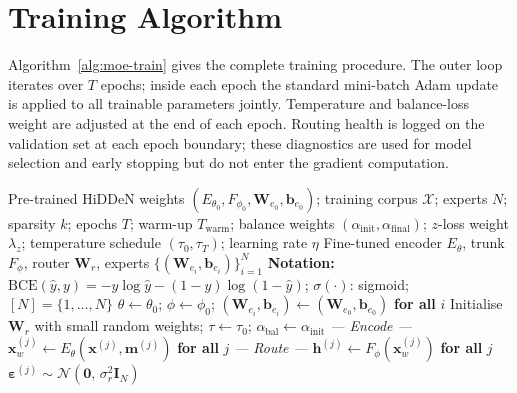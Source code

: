 ﻿\documentclass[12pt, a4paper, twoside]{report}
\numberwithin{equation}{chapter}
\begin{document}
\section{Training Algorithm}
\label{sec:training-alg}

Algorithm~\ref{alg:moe-train} gives the complete training procedure. The outer loop iterates over $T$ epochs; inside each epoch the standard mini-batch Adam update is applied to all trainable parameters jointly. Temperature and balance-loss weight are adjusted at the end of each epoch. Routing health is logged on the validation set at each epoch boundary; these diagnostics are used for model selection and early stopping but do not enter the gradient computation.

\begin{algorithm}[H]
\caption{Train MoE Watermark Decoder}
\label{alg:moe-train}
\begin{algorithmic}[1]
\Require Pre-trained HiDDeN weights $(E_{\theta_0}, F_{\phi_0}, \mathbf{W}_{e_0}, \mathbf{b}_{e_0})$; training corpus $\mathcal{X}$;
         experts $N$; sparsity $k$; epochs $T$; warm-up $T_\mathrm{warm}$;
         balance weights $(\alpha_\mathrm{init}, \alpha_\mathrm{final})$; $z$-loss weight $\lambda_z$;
         temperature schedule $(\tau_0, \tau_T)$; learning rate $\eta$
\Ensure Fine-tuned encoder $E_\theta$, trunk $F_\phi$, router $\mathbf{W}_r$,
        experts $\{(\mathbf{W}_{e_i}, \mathbf{b}_{e_i})\}_{i=1}^N$
\Statex
\Statex \textbf{Notation:}\; $\mathrm{BCE}(\hat{y},y)=-y\log\hat{y}-(1-y)\log(1-\hat{y})$;\; $\sigma(\cdot)$: sigmoid;\; $[N]=\{1,\ldots,N\}$
\Statex
{}
\State $\theta\leftarrow\theta_0$;\; $\phi\leftarrow\phi_0$;\; $(\mathbf{W}_{e_i},\mathbf{b}_{e_i})\leftarrow(\mathbf{W}_{e_0},\mathbf{b}_{e_0})$ \textbf{for all} $i$ 
\State Initialise $\mathbf{W}_r$ with small random weights;\; $\tau\leftarrow\tau_0$;\; $\alpha_\mathrm{bal}\leftarrow\alpha_\mathrm{init}$
        \Statex \hspace{2.5em}\textit{--- Encode ---}
        \State $\mathbf{x}_w^{(j)} \leftarrow E_\theta(\mathbf{x}^{(j)}, \mathbf{m}^{(j)})$ \textbf{for all} $j$ 
        \Statex \hspace{2.5em}\textit{--- Route ---}
        \State $\mathbf{h}^{(j)} \leftarrow F_\phi(\mathbf{x}_w^{(j)})$ \textbf{for all} $j$ 
        \State $\boldsymbol{\varepsilon}^{(j)} \sim \mathcal{N}(\mathbf{0},\,\sigma_r^2\mathbf{I}_N)$ 

\end{algorithmic}
\end{algorithm}
\end{document}
